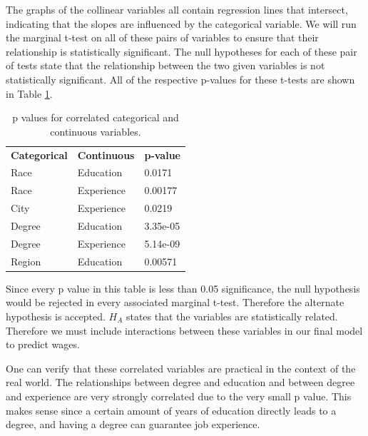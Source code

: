 \documentclass{article}
\begin{document}
      The graphs of the collinear variables all contain regression lines that
      intersect, indicating that the slopes are influenced by the categorical
      variable. We will run the marginal t-test on all of these pairs of variables
      to ensure that their relationship is statistically significant. The null
      hypotheses for each of these pair of tests state that the relationship
      between the two given variables is not statistically significant. All of the
      respective p-values for these t-tests are shown in Table \ref{tab:p-val}.

      \begin{table}[H]
        \centering
        \begin{tabular}{lll}
        \textbf{Categorical} & \textbf{Continuous} & \textbf{p-value} \\
        Race                 & Education           & 0.0171           \\
        Race                 & Experience          & 0.00177          \\
        City                 & Experience          & 0.0219           \\
        Degree               & Education           & 3.35e-05         \\
        Degree               & Experience          & 5.14e-09         \\
        Region               & Education           & 0.00571
        \end{tabular}
        \caption{p values for correlated categorical and continuous variables.}
        \label{tab:p-val}
      \end{table}

      Since every p value in this table is less than 0.05 significance, the
      null hypothesis would be rejected in every associated marginal t-test.
      Therefore the alternate hypothesis is accepted. $H_A$ states that the
      variables are statistically related. Therefore we must include interactions
      between these variables in our final model to predict wages.

      One can verify that these correlated variables are practical in the context of the real world.
      The relationships between degree and education and between degree and
      experience are very strongly correlated due to the very small p value.
      This makes sense since a certain amount of years of education directly leads
      to a degree, and having a degree can guarantee job experience. \\
\end{document}
